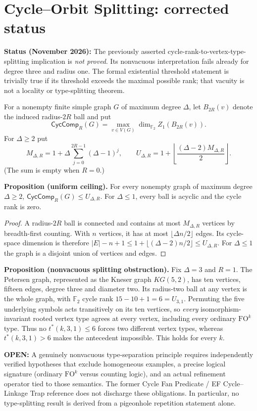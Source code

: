 \section*{Cycle--Orbit Splitting: corrected status}

\noindent\textbf{Status (November 2026):} The previously asserted
cycle-rank-to-vertex-type-splitting implication is \emph{not proved}.
Its nonvacuous interpretation fails already for degree three and radius one.
The formal existential threshold statement is trivially true if its
threshold exceeds the maximal possible rank; that vacuity is not a locality
or type-splitting theorem.

For a nonempty finite simple graph $G$ of maximum degree $\Delta$, let
$B_{2R}(v)$ denote the induced radius-$2R$ ball and put
\[
\mathsf{CycComp}_R(G)
 = \max_{v\in V(G)}\dim_{\mathbb F_2} Z_1(B_{2R}(v)).
\]
For $\Delta\ge 2$ put
\[
M_{\Delta,R}=1+\Delta\sum_{j=0}^{2R-1}(\Delta-1)^j,
\qquad U_{\Delta,R}=1+\left\lfloor
 \frac{(\Delta-2)M_{\Delta,R}}{2}\right\rfloor .
\]
(The sum is empty when $R=0$.)

\noindent\textbf{Proposition (uniform ceiling).}
For every nonempty graph of maximum degree $\Delta\ge2$,
$\mathsf{CycComp}_R(G)\le U_{\Delta,R}$.
For $\Delta\le1$, every ball is acyclic and the cycle rank is zero.
\begin{proof}
A radius-$2R$ ball is connected and contains at most $M_{\Delta,R}$
vertices by breadth-first counting. With $n$ vertices, it has at most
$\lfloor\Delta n/2\rfloor$ edges. Its cycle-space dimension is therefore
$|E|-n+1\le 1+\lfloor(\Delta-2)n/2\rfloor \le U_{\Delta,R}$.
For $\Delta\le1$ the graph is a disjoint union of vertices and edges.
\end{proof}

\noindent\textbf{Proposition (nonvacuous splitting obstruction).}
Fix $\Delta=3$ and $R=1$. The Petersen graph, represented as the Kneser
graph $KG(5,2)$, has ten vertices, fifteen edges, degree three and diameter
two. Its radius-two ball at any vertex is the whole graph, with
$\mathbb F_2$ cycle rank $15-10+1=6=U_{3,1}$.
Permuting the five underlying symbols acts transitively on its ten
vertices, so \emph{every} isomorphism-invariant rooted vertex type agrees
at every vertex, including every ordinary $\mathrm{FO}^k$ type.
Thus no $t^*(k,3,1)\le6$ forces two different vertex types, whereas
$t^*(k,3,1)>6$ makes the antecedent impossible. This holds for every $k$.

\noindent\textbf{OPEN:} A genuinely nonvacuous type-separation principle
requires independently verified hypotheses that exclude homogeneous
examples, a precise logical signature (ordinary $\mathrm{FO}^k$ versus
counting logic), and an actual refinement operator tied to those semantics.
The former Cycle Fan Predicate / EF Cycle--Linkage Trap reference does
not discharge these obligations. In particular, no type-splitting result
is derived from a pigeonhole repetition statement alone.

